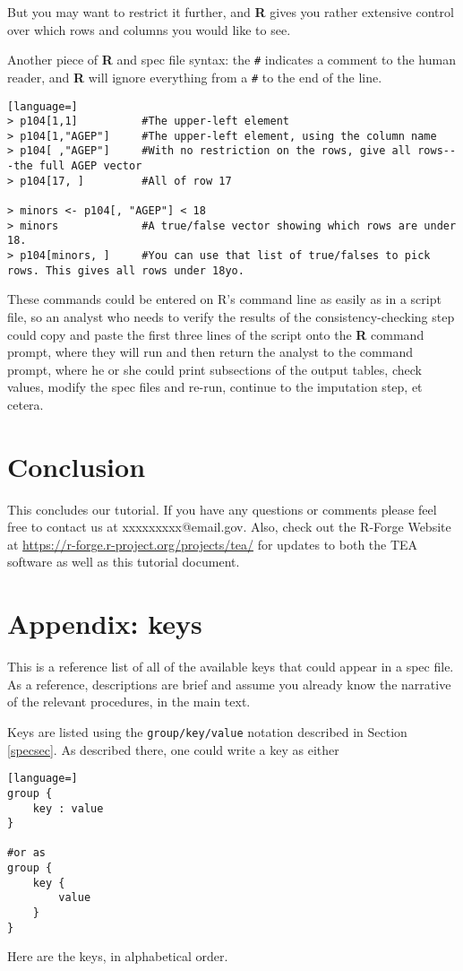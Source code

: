 \documentclass{article}
\begin{document}
But you may want to restrict it further, and \textbf{R} gives you rather extensive control over
which rows and columns you would like to see.

Another piece of \textbf{R} and spec file syntax: the {\tt \#} indicates a comment to the human
reader, and \textbf{R} will ignore everything from a {\tt \#} to the end of the line.

\begin{lstlisting}[language=]
> p104[1,1]          #The upper-left element
> p104[1,"AGEP"]     #The upper-left element, using the column name
> p104[ ,"AGEP"]     #With no restriction on the rows, give all rows---the full AGEP vector
> p104[17, ]         #All of row 17

> minors <- p104[, "AGEP"] < 18
> minors             #A true/false vector showing which rows are under 18.
> p104[minors, ]     #You can use that list of true/falses to pick rows. This gives all rows under 18yo.
\end{lstlisting}

These commands could be entered on R's command line as easily as in a script file, so an
analyst who needs to verify the results of the consistency-checking step could copy and
paste the first three lines of the script onto the \textbf{R} command prompt, where they will run and
then return the analyst to the command prompt, where he or she could print subsections of
the output tables, check values, modify the spec files and re-run, continue to the
imputation step, et cetera.


\section{Conclusion}
This concludes our tutorial. If you have any questions or comments please feel free to contact 
us at xxxxxxxxx@email.gov. Also, check out the R-Forge Website at 
\url{https://r-forge.r-project.org/projects/tea/} for updates to both the TEA software as well 
as this tutorial document.

\section*{Appendix: keys}

This is a reference list of all of the available keys that could appear in a spec file.
As a reference, descriptions are brief and assume you already know the narrative of the
relevant procedures, in the main text.

Keys are listed using the {\tt group/key/value} notation described in Section \ref{specsec}. As described there, one could write a key as either
\begin{lstlisting}[language=]
group {
    key : value
}

#or as
group {
    key {
        value
    }
}
\end{lstlisting}

Here are the keys, in alphabetical order.



%
%
%
\end{document}
